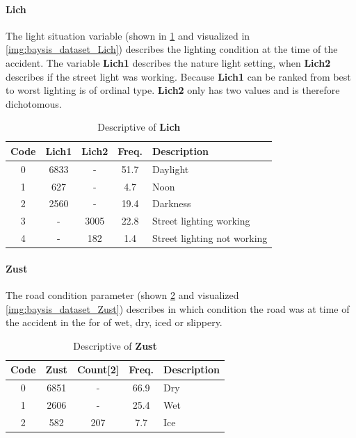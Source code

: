 \paragraph{Lich}
\label{baysis_dataset_Lich}
The light situation variable (shown in \cref{tbl:baysis_dataset_Lich} and visualized in \cref{img:baysis_dataset_Lich}) describes the lighting condition at the time of the accident. The variable \textbf{Lich1} describes the nature light setting, when \textbf{Lich2} describes if the street light was working. Because \textbf{Lich1} can be ranked from best to worst lighting is of ordinal type. \textbf{Lich2} only has two values and is therefore dichotomous.
\begin{table}[ht]
	\centering
	\small
	\begin{tabular}{c|c|c|c|l}
		\toprule
		Code & \textbf{Lich1} & \textbf{Lich2} & Freq. & Description \\ 
		\midrule 
		0 & 6833 	& - 	& 51.7 & Daylight \\
		1 & 627 	& -		& 4.7  & Noon \\
		2 & 2560	& - 	& 19.4 & Darkness \\
		3 & - 		& 3005	& 22.8 & Street lighting working \\
		4 & - 		& 182	& 1.4  & Street lighting not working \\
		\bottomrule
	\end{tabular}
	\caption{Descriptive of \textbf{Lich}}
	\label{tbl:baysis_dataset_Lich}
	\vspace{-8mm}
\end{table} 
\paragraph{Zust}
\label{baysis_dataset_Zust}
The road condition parameter (shown \cref{tbl:baysis_dataset_Zust} and visualized \cref{img:baysis_dataset_Zust}) describes in which condition the road was at time of the accident in the for of wet, dry, iced or slippery.
\begin{table}[ht]
	\centering
	\small
	\begin{tabular}{c|c|c|c|l}
		\toprule
		Code & \textbf{Zust} & Count[2] & Freq. & Description \\ 
		\midrule 
		0 & 6851 	& -		& 66.9 & Dry \\ 
 		1 & 2606	& -		& 25.4 & Wet \\ 
 		2 & 582		& 207	& 7.7  & Ice \\
	\end{tabular}
	\caption{Descriptive of \textbf{Zust}}
	\label{tbl:baysis_dataset_Zust}
	\vspace{-8mm}
\end{table}
